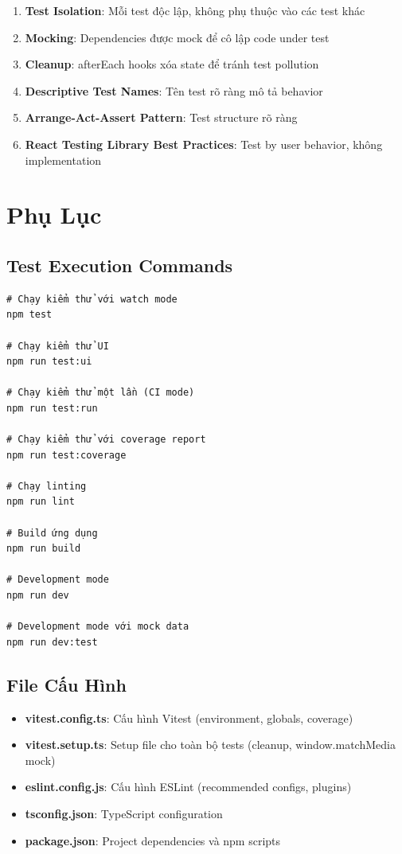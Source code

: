 \documentclass[12pt,a4paper,vietnamese]{article}
\begin{document}
\begin{enumerate}
    \item \textbf{Test Isolation}: Mỗi test độc lập, không phụ thuộc vào các test khác
    \item \textbf{Mocking}: Dependencies được mock để cô lập code under test
    \item \textbf{Cleanup}: afterEach hooks xóa state để tránh test pollution
    \item \textbf{Descriptive Test Names}: Tên test rõ ràng mô tả behavior
    \item \textbf{Arrange-Act-Assert Pattern}: Test structure rõ ràng
    \item \textbf{React Testing Library Best Practices}: Test by user behavior, không implementation
\end{enumerate}


\section{Phụ Lục}

\subsection{Test Execution Commands}

\begin{verbatim}
# Chạy kiểm thử với watch mode
npm test

# Chạy kiểm thử UI
npm run test:ui

# Chạy kiểm thử một lần (CI mode)
npm run test:run

# Chạy kiểm thử với coverage report
npm run test:coverage

# Chạy linting
npm run lint

# Build ứng dụng
npm run build

# Development mode
npm run dev

# Development mode với mock data
npm run dev:test
\end{verbatim}

\subsection{File Cấu Hình}

\begin{itemize}
    \item \textbf{vitest.config.ts}: Cấu hình Vitest (environment, globals, coverage)
    \item \textbf{vitest.setup.ts}: Setup file cho toàn bộ tests (cleanup, window.matchMedia mock)
    \item \textbf{eslint.config.js}: Cấu hình ESLint (recommended configs, plugins)
    \item \textbf{tsconfig.json}: TypeScript configuration
    \item \textbf{package.json}: Project dependencies và npm scripts
\end{itemize}
\end{document}
